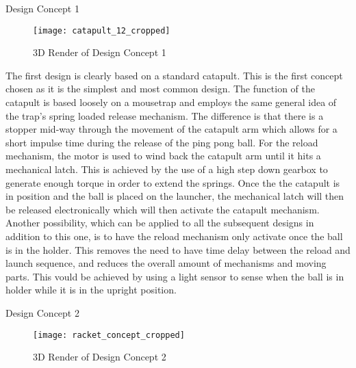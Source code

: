 \begin{homeworkProblem}
\begin{homeworkSection}{Design Concept 1}
  \begin{figure}[H]
    \begin{center}
      \texttt{[image: catapult\_12\_cropped]}
      \caption{3D Render of Design Concept 1}
      \label{concept1}
    \end{center}
  \end{figure}

The first design is clearly based on a standard catapult. This is the first concept chosen as it is the simplest and most common design. The function of the catapult is based loosely on a mousetrap and employs the same general idea of the trap's spring loaded release mechanism. The difference is that there is a stopper mid-way through the movement of the catapult arm which allows for a short impulse time during the release of the ping pong ball. For the reload mechanism, the motor is used to wind back the catapult arm until it hits a mechanical latch. This is achieved by the use of a high step down gearbox to generate enough torque in order to extend the springs. Once the the catapult is in position and the ball is placed on the launcher, the mechanical latch will then be released electronically which will then activate the catapult mechanism. \\

Another possibility, which can be applied to all the subsequent designs in addition to this one, is to have the reload mechanism only activate once the ball is in the holder. This removes the need to have time delay between the reload and launch sequence, and reduces the overall amount of mechanisms and moving parts. This vould be achieved by using a light sensor to sense when the ball is in holder while it is in the upright position.
\end{homeworkSection}

\begin{homeworkSection}{Design Concept 2}
  \begin{figure}[H]
    \begin{center}
      \texttt{[image: racket\_concept\_cropped]}
      \caption{3D Render of Design Concept 2}
      \label{concept2}
    \end{center}
  \end{figure}


\end{homeworkSection}
\end{homeworkProblem}
